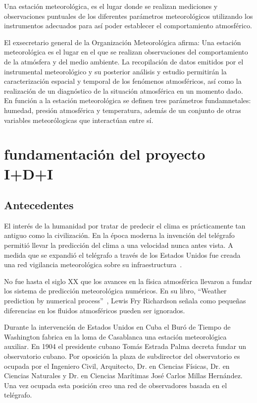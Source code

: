 \documentclass[conference, a4paper]{IEEEtran}
\begin{document}
Una estación meteorológica, es el lugar donde se realizan mediciones y
observaciones puntuales de los diferentes parámetros meteorológicos utilizando
los instrumentos adecuados para así poder establecer el comportamiento
atmosférico.

El exsecretario general de la Organización Meteorológica afirma: Una estación
meteorológica es el lugar en el que se realizan observaciones del
comportamiento de la atmósfera y del medio ambiente.
La recopilación de datos emitidos por el instrumental meteorológico y su
posterior análisis y estudio permitirán la caracterización espacial y temporal
de los fenómenos atmosféricos, así como la realización de un diagnóstico de la
situación atmosférica en un momento dado.
En función a la estación meteorológica se definen tres parámetros
fundamnetales: humedad, presión atmosférica y temperatura, además de un
conjunto de otras variables meteorólogicas que interactúan entre sí.

\section{fundamentación del proyecto I+D+I}\label{sec:fundamentacion-del-proyecto-i+d+i}

\subsection{Antecedentes}\label{subsec:antecedentes}
El interés de la humanidad por tratar de predecir el clima es prácticamente tan
antiguo como la civilización.
En la época moderna la invención del telégrafo permitió llevar la predicción
del clima a una velocidad nunca antes vista.
A medida que se expandió el telégrafo a través de los Estados Unidos fue creada
una red vigilancia meteorológica sobre su
infraestructura~\cite{ThomasJeffersonTelegraph}.

No fue hasta el siglo XX que los avances en la física atmosférica llevaron a
fundar los sistema de predicción meteorológica numéricos.
En su libro, ``Weather prediction by numerical
process''~\cite{richardsonWeatherPredictionNumerical1922}, Lewis Fry Richardson
señala como pequeñas diferencias en los fluidos atmosféricos pueden ser
ignorados.

Durante la intervención de Estados Unidos en Cuba el Buró de Tiempo de
Washington fabrica en la loma de Casablanca una estación meteorológica
auxiliar.
En 1904 el presidente cubano Tomás Estrada Palma decreta fundar un observatorio
cubano.
Por oposición la plaza de subdirector del observatorio es ocupada por el
Ingeniero Civil, Arquitecto, Dr.
en Ciencias Físicas, Dr. en Ciencias Naturales
y Dr. en Ciencias Marítimas José Carlos Millas Hernández.
Una vez ocupada esta posición creo una red de observadores basada en el
telégrafo.
\end{document}
